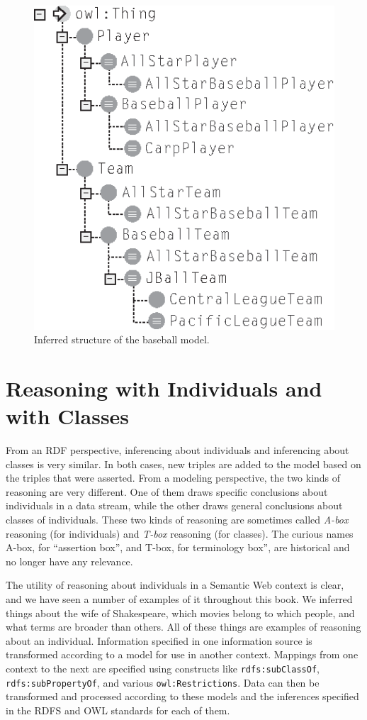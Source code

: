 \begin{figure}
\centering
\includegraphics[width=5in]{media/ch13/f13-10.eps}
\caption{Inferred structure of the baseball model.}
\label{fig:ch13.10}
\end{figure}

\section{Reasoning with Individuals and with Classes}

From an RDF perspective, inferencing about individuals and inferencing
about classes is very similar. In both cases, new triples are added to
the model based on the triples that were asserted. From a modeling
perspective, the two kinds of reasoning are very different. One of them
draws specific conclusions about individuals in a data stream, while the
other draws general conclusions about classes of individuals. These two
kinds of reasoning are sometimes called \emph{A-box} reasoning (for individuals)
and \emph{T-box} reasoning (for classes). The curious names A-box, for
``assertion box'', and T-box, for terminology box'', are historical and
no longer have any relevance.

The utility of reasoning about individuals in a Semantic Web context is
clear, and we have seen a number of examples of it throughout this book.
We inferred things about the wife of Shakespeare, which movies belong to
which people, and what terms are broader than others. All of these
things are examples of reasoning about an individual. Information
specified in one information source is transformed according to a model
for use in another context. Mappings from one context to the next are
specified using constructs like \texttt{rdfs:subClassOf}, \texttt{rdfs:subPropertyOf}, and
various \texttt{owl:Restrictions}. Data can then be transformed and processed
according to these models and the inferences specified in the RDFS and
OWL standards for each of them.

